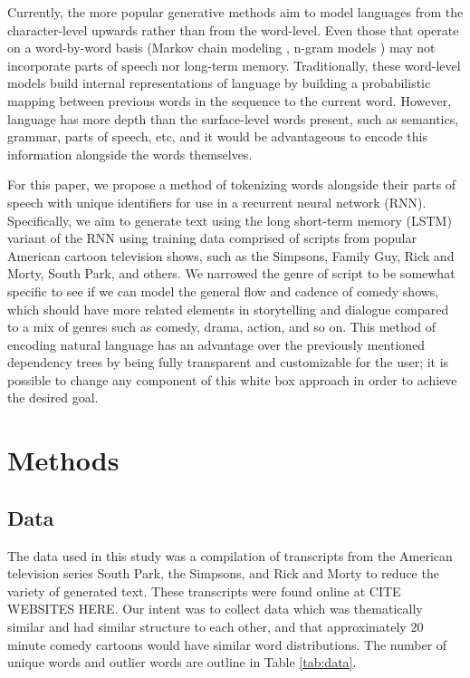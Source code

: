 \documentclass[conference]{IEEEtran}
\begin{document}
Currently, the more popular generative methods aim to model languages from the character-level upwards rather than from the word-level. Even those that operate on a word-by-word basis (Markov chain modeling \cite{conroy2001text}, n-gram models \cite{masataki1996variable}) may not incorporate parts of speech nor long-term memory. Traditionally, these word-level models build internal representations of language by building a probabilistic mapping between previous words in the sequence to the current word. However, language has more depth than the surface-level words present, such as semantics, grammar, parts of speech, etc, and it would be advantageous to encode this information alongside the words themselves.

For this paper, we propose a method of tokenizing words alongside their parts of speech with unique identifiers for use in a recurrent neural network (RNN). Specifically, we aim to generate text using the long short-term memory (LSTM) variant of the RNN using training data comprised of scripts from popular American cartoon television shows, such as the Simpsons, Family Guy, Rick and Morty, South Park, and others. We narrowed the genre of script to be somewhat specific to see if we can model the general flow and cadence of comedy shows, which should have more related elements in storytelling and dialogue compared to a mix of genres such as comedy, drama, action, and so on.  This method of encoding natural language has an advantage over the previously mentioned dependency trees by being fully transparent and customizable for the user; it is possible to change any component of this white box approach in order to achieve the desired goal.

\section{Methods}

\subsection{Data}

The data used in this study was a compilation of transcripts from the American television series South Park, the Simpsons, and Rick and Morty to reduce the variety of generated text.  These transcripts were found online at {CITE WEBSITES HERE}. Our intent was to collect data which was thematically similar and had similar structure to each other, and that approximately $20$ minute comedy cartoons would have similar word distributions.  The number of unique words and outlier words are outline in Table \ref{tab:data}.
\end{document}
